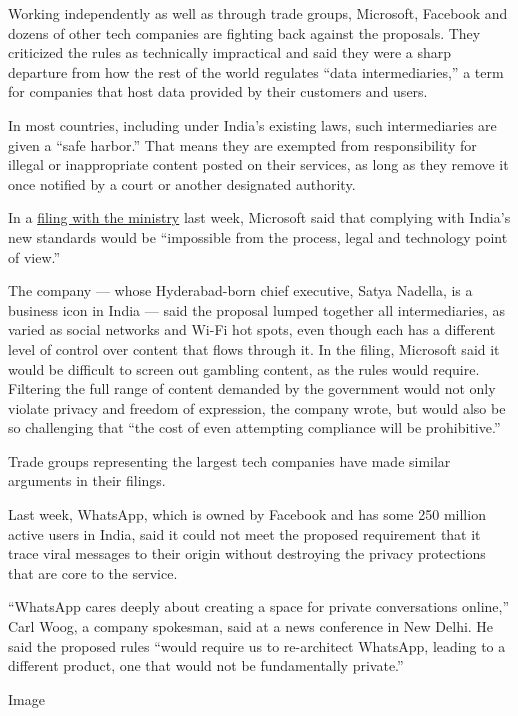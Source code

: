 Working independently as well as through trade groups, Microsoft,
Facebook and dozens of other tech companies are fighting back against
the proposals. They criticized the rules as technically impractical and
said they were a sharp departure from how the rest of the world
regulates ``data intermediaries,'' a term for companies that host data
provided by their customers and users.

In most countries, including under India's existing laws, such
intermediaries are given a ``safe harbor.'' That means they are exempted
from responsibility for illegal or inappropriate content posted on their
services, as long as they remove it once notified by a court or another
designated authority.

In a
\href{https://meity.gov.in/content/addendum1-comments-received-publicstakeholders-draft-\%E2\%80\%9C-information-technology-intermediary}{filing
with the ministry} last week, Microsoft said that complying with India's
new standards would be ``impossible from the process, legal and
technology point of view.''

The company --- whose Hyderabad-born chief executive, Satya Nadella, is
a business icon in India --- said the proposal lumped together all
intermediaries, as varied as social networks and Wi-Fi hot spots, even
though each has a different level of control over content that flows
through it. In the filing, Microsoft said it would be difficult to
screen out gambling content, as the rules would require. Filtering the
full range of content demanded by the government would not only violate
privacy and freedom of expression, the company wrote, but would also be
so challenging that ``the cost of even attempting compliance will be
prohibitive.''

Trade groups representing the largest tech companies have made similar
arguments in their filings.

Last week, WhatsApp, which is owned by Facebook and has some 250 million
active users in India, said it could not meet the proposed requirement
that it trace viral messages to their origin without destroying the
privacy protections that are core to the service.

``WhatsApp cares deeply about creating a space for private conversations
online,'' Carl Woog, a company spokesman, said at a news conference in
New Delhi. He said the proposed rules ``would require us to re-architect
WhatsApp, leading to a different product, one that would not be
fundamentally private.''

Image

